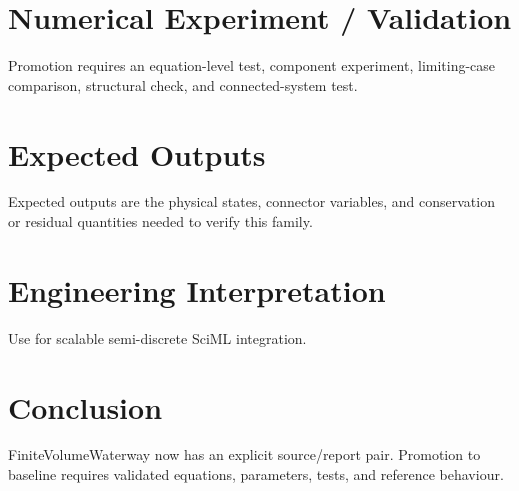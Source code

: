 \documentclass[10pt,a4paper]{article}
\begin{document}
\section{Numerical Experiment / Validation}Promotion requires an equation-level test, component experiment, limiting-case comparison, structural check, and connected-system test.
\section{Expected Outputs}Expected outputs are the physical states, connector variables, and conservation or residual quantities needed to verify this family.
\section{Engineering Interpretation}Use for scalable semi-discrete SciML integration.
\section*{Conclusion}FiniteVolumeWaterway now has an explicit source/report pair. Promotion to baseline requires validated equations, parameters, tests, and reference behaviour.
\end{document}
